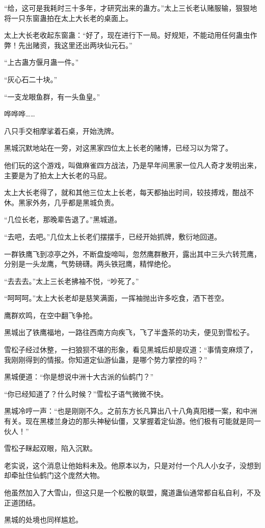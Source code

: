 \begin{this_body}
“给，这可是我耗时三十多年，才研究出来的蛊方。”太上三长老认赌服输，狠狠地将一只东窗蛊拍在太上大长老的桌面上。

太上大长老收起东窗蛊：“好了，现在进行下一局。好规矩，不能动用任何蛊虫作弊！先出赌资，我这里还出两块仙元石。”

“上古蛊方偃月蛊一件。”

“灰心石二十块。”

“一支龙眼鱼群，有一头鱼皇。”

哗哗哗……

八只手交相摩挲着石桌，开始洗牌。

黑城沉默地站在一旁，对这黑家四位太上长老的赌博，已经习以为常了。

他们玩的这个游戏，叫做麻雀四方战法，乃是早年间黑家一位凡人奇才发明出来，主要是为了拍太上大长老的马屁。

太上大长老得了，就和其他三位太上长老，每天都抽出时间，较技搏戏，酣战不休。黑家外务，几乎都是黑城负责。

“几位长老，那晚辈告退了。”黑城道。

“去吧，去吧。”几位太上长老们摆摆手，已经开始抓牌，敷衍地回道。

一群铁鹰飞到凉亭之外，不断盘旋啼叫，忽然鹰群散开，露出其中三头六转荒鹰，分别是一头龙鹰，气势磅礴。两头铁冠鹰，精悍绝伦。

“去去去。”太上三长老拂袖不悦，“吵死了。”

“呵呵呵。”太上大长老却是慈笑满面，一挥袖抛出许多吃食，洒下苍空。

鹰群欢鸣，在空中翻飞争抢。

黑城出了铁鹰福地，一路往西南方向疾飞，飞了半盏茶的功夫，便见到雪松子。

雪松子经过休整，一扫狼狈不堪的形象，看见黑城后却是叹道：“事情变麻烦了，我刚刚得到的情报。你知道定仙游仙蛊，是哪个势力掌控的吗？”

黑城便道：“你是想说中洲十大古派的仙鹤门？”

“你已经知道了？什么时候？”雪松子语气微微不快。

黑城冷哼一声：“也是刚刚不久。之前东方长凡算出八十八角真阳楼一案，和中洲有关。现在黑楼兰身边的那头神秘仙僵，又掌握着定仙游。他们极有可能就是同一伙人！”

雪松子眯起双眼，陷入沉默。

老实说，这个消息让他始料未及。他原本以为，只是对付一个凡人小女子，没想到却牵扯住仙鹤门这个庞然大物。

他虽然加入了大雪山，但这只是一个松散的联盟，魔道蛊仙通常都自私自利，不及正道团结。

黑城的处境也同样尴尬。


\end{this_body}
